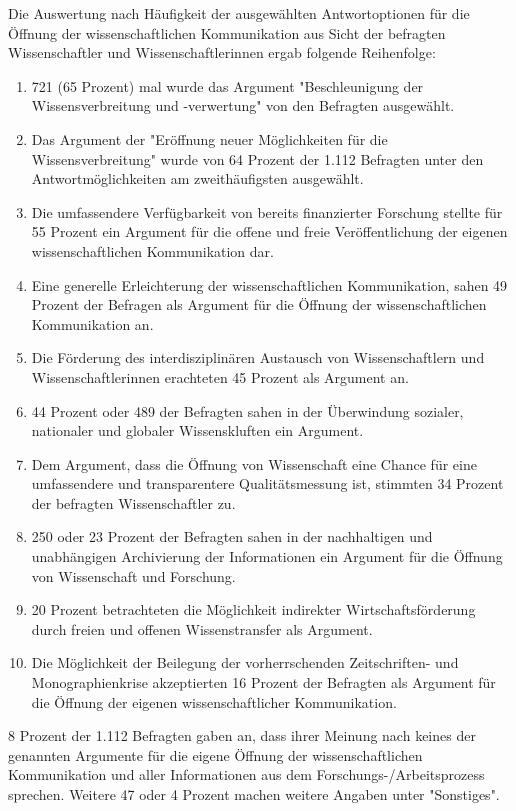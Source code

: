 Die Auswertung nach Häufigkeit der ausgewählten Antwortoptionen für die Öffnung der wissenschaftlichen Kommunikation aus Sicht der befragten Wissenschaftler und Wissenschaftlerinnen ergab folgende Reihenfolge:
\begin{enumerate}
\item 721 (65 Prozent) mal wurde das Argument "Beschleunigung der Wissensverbreitung und -verwertung" von den Befragten ausgewählt.
\item Das Argument der "Eröffnung neuer Möglichkeiten für die Wissensverbreitung" wurde von 64 Prozent der 1.112 Befragten unter den Antwortmöglichkeiten am zweithäufigsten ausgewählt.
\item Die umfassendere Verfügbarkeit von bereits finanzierter Forschung stellte für 55 Prozent ein Argument für die offene und freie Veröffentlichung der eigenen wissenschaftlichen Kommunikation dar.
\item Eine generelle Erleichterung der wissenschaftlichen Kommunikation, sahen 49 Prozent der Befragen als Argument für die Öffnung der wissenschaftlichen Kommunikation an.
\item Die Förderung des interdisziplinären Austausch von Wissenschaftlern und Wissenschaftlerinnen erachteten 45 Prozent als Argument an.
\item 44 Prozent oder 489 der Befragten sahen in der Überwindung sozialer, nationaler und globaler Wissenskluften ein Argument.
\item Dem Argument, dass die Öffnung von Wissenschaft eine Chance für eine umfassendere und transparentere Qualitätsmessung ist, stimmten 34 Prozent der befragten Wissenschaftler zu.
\item 250 oder 23 Prozent der Befragten sahen in der nachhaltigen und unabhängigen Archivierung der Informationen ein Argument für die Öffnung von Wissenschaft und Forschung.
\item 20 Prozent betrachteten die Möglichkeit indirekter Wirtschaftsförderung durch freien und offenen Wissenstransfer als Argument.
\item Die Möglichkeit der Beilegung der vorherrschenden Zeitschriften- und Monographienkrise akzeptierten 16 Prozent der Befragten als Argument für die Öffnung der eigenen wissenschaftlicher Kommunikation.
\end{enumerate}

8 Prozent der 1.112 Befragten gaben an, dass ihrer Meinung nach keines der genannten Argumente für die eigene Öffnung der wissenschaftlichen Kommunikation und aller Informationen aus dem Forschungs-/Arbeitsprozess sprechen. Weitere 47 oder 4 Prozent machen weitere Angaben unter "Sonstiges".

